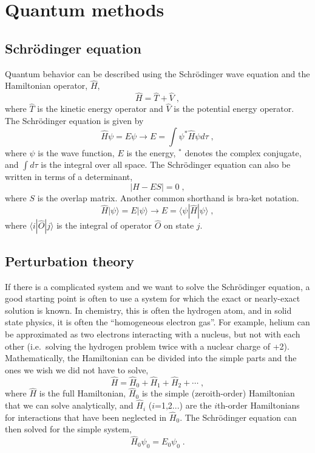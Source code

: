 \documentclass[12pt]{report}
\begin{document}
\section{Quantum methods}

\subsection{Schr\"{o}dinger equation}

Quantum behavior can be described using the Schr\"{o}dinger wave equation and
the Hamiltonian operator, $\hat H$,
\begin{equation}
 \hat H = \hat T + \hat V \; ,
\end{equation}
where $\hat T$ is the kinetic energy operator and $\hat V$ is the potential
energy operator.
The Schr\"{o}dinger equation is given by
\begin{equation}
 \hat H\psi = E\psi \to E = \int \psi^*\hat H\psi d\tau \; ,
\end{equation}
where $\psi$ is the wave function, $E$ is the energy, $^*$ denotes the complex
conjugate, and $\int d\tau$ is the integral over all space.
The Schr\"{o}dinger equation can also be written in terms of a determinant,
\begin{equation}
 |H-ES| = 0 \; ,
\end{equation}
where $S$ is the overlap matrix.
Another common shorthand is bra-ket notation.
\begin{equation}
 \hat H|\psi\rangle = E|\psi\rangle \to E=\langle\psi|\hat H|\psi\rangle \; ,
\end{equation}
where $\langle i|\hat O|j\rangle$ is the integral of operator $\hat O$ on
state $j$.

\subsection{Perturbation theory}

If there is a complicated system and we want to solve the Schr\"{o}dinger
equation, a good starting point is often to use a system for which the exact
or nearly-exact solution is known.
In chemistry, this is often the hydrogen atom, and in solid state physics, it
is often the ``homogeneous electron gas''.
For example, helium can be approximated as two electrons interacting with a
nucleus, but not with each other (i.e.\ solving the hydrogen problem twice
with a nuclear charge of +2). \\

Mathematically, the Hamiltonian can be divided into the simple parts and the
ones we wish we did not have to solve,
\begin{equation}
 \hat H = \hat H_0+\hat H_1+\hat H_2+\cdots \; ,
\end{equation}
where $\hat H$ is the full Hamiltonian, $\hat H_0$ is the simple
(zeroith-order) Hamiltonian that we can solve analytically, and $\hat H_i$
($i$=1,2...) are the $i$th-order Hamiltonians for interactions that have been
neglected in $\hat H_0$.
The Schr\"{o}dinger equation can then solved for the simple system,
\begin{equation}
 \hat H_0\psi_0=E_0\psi_0 \; .
\end{equation}
\end{document}
